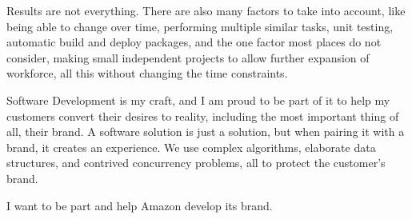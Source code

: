 Results are not everything. There are also many factors to take into account, like being able to change over time, performing multiple similar tasks, unit testing, automatic build and deploy packages, and the one factor most places do not consider, making small independent projects to allow further expansion of workforce, all this without changing the time constraints.

Software Development is my craft, and I am proud to be part of it to help my customers convert their desires to reality, including the most important thing of all, their brand. A software solution is just a solution, but when pairing it with a brand, it creates an experience. We use complex algorithms, elaborate data structures, and contrived concurrency problems, all to protect the customer's brand.

I want to be part and help Amazon develop its brand.
